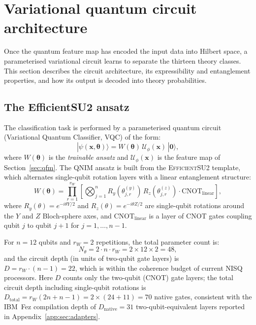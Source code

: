 \documentclass[11pt,a4paper, english]{book}
\theoremstyle{plain}
\theoremstyle{definition}
\numberwithin{equation}{chapter}
\numberwithin{figure}{chapter}
\numberwithin{table}{chapter}
\begin{document}
\section{Variational quantum circuit architecture}
\label{sec:vqc}
Once the quantum feature map has encoded the input data into Hilbert space, a parameterised variational circuit learns to separate the thirteen theory classes. This section describes the circuit architecture, its expressibility and entanglement properties, and how its output is decoded into theory probabilities.
\subsection{The EfficientSU2 ansatz}
\label{subsec:efficient_su2}

The classification task is performed by a parameterised quantum circuit
(Variational Quantum Classifier, VQC) of the form:
\begin{equation}
  \label{eq:vqc}
  |\psi(\mathbf{x},\boldsymbol{\theta})\rangle =
    W(\boldsymbol{\theta})\,\mathcal{U}_\phi(\mathbf{x})\,|\mathbf{0}\rangle,
\end{equation}
where $W(\boldsymbol{\theta})$ is the \emph{trainable ansatz} and
$\mathcal{U}_\phi(\mathbf{x})$ is the feature map of
Section~\ref{sec:qfm}.  The QNIM ansatz is built from the
\textsc{EfficientSU2} template, which alternates single-qubit rotation
layers with a linear entanglement structure:
\begin{equation}
  \label{eq:eff_su2}
  W(\boldsymbol{\theta}) =
    \prod_{r=1}^{r_W}
    \left[
      \bigotimes_{j=1}^{n} R_y(\theta_{j,r}^{(y)})\,R_z(\theta_{j,r}^{(z)})
      \cdot \mathrm{CNOT}_{\mathrm{linear}}
    \right],
\end{equation}
where $R_y(\theta) = e^{-i\theta Y/2}$ and $R_z(\theta) = e^{-i\theta Z/2}$
are single-qubit rotations around the $Y$ and $Z$ Bloch-sphere axes, and
$\mathrm{CNOT}_\mathrm{linear}$ is a layer of CNOT gates coupling qubit $j$
to qubit $j+1$ for $j = 1,\ldots,n-1$.

For $n = 12$ qubits and $r_W = 2$ repetitions, the total parameter count is:
\begin{equation}
  \label{eq:param_count}
  N_\theta = 2 \cdot n \cdot r_W = 2 \times 12 \times 2 = 48,
\end{equation}
and the circuit depth (in units of two-qubit gate layers) is
$D = r_W \cdot (n-1) = 22$, which is within the coherence budget of
current NISQ processors.
Here $D$ counts only the two-qubit (CNOT) gate layers; 
the total circuit depth including single-qubit rotations 
is $D_\mathrm{total} = r_W(2n + n - 1) = 2 \times (24 + 11) = 70$ 
native gates, consistent with the IBM~Fez compilation 
depth of $D_\mathrm{native} = 31$ two-qubit-equivalent layers 
reported in Appendix~\ref{app:sec:adapters}.
\end{document}
